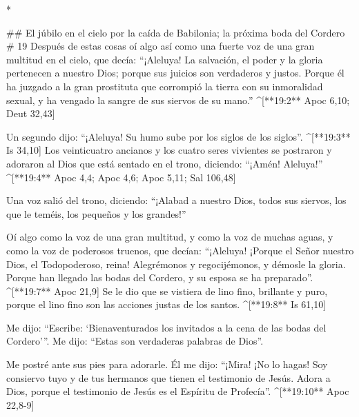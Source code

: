 \begin{paracols}{2}
\begin{english}
\end{english}
\switchcolumn[0]*

## El júbilo en el cielo por la caída de Babilonia; la próxima boda del Cordero
# 19
 Después de estas cosas oí algo así como una fuerte voz de una gran multitud en el cielo, que decía: “¡Aleluya! La salvación, el poder y la gloria pertenecen a nuestro Dios;  porque sus juicios son verdaderos y justos. Porque él ha juzgado a la gran prostituta que corrompió la tierra con su inmoralidad sexual, y ha vengado la sangre de sus siervos de su mano.” ^[**19:2** Apoc 6,10; Deut 32,43]

 Un segundo dijo: “¡Aleluya! Su humo sube por los siglos de los siglos”. ^[**19:3** Is 34,10]  Los veinticuatro ancianos y los cuatro seres vivientes se postraron y adoraron al Dios que está sentado en el trono, diciendo: “¡Amén! Aleluya!” ^[**19:4** Apoc 4,4; Apoc 4,6; Apoc 5,11; Sal 106,48]

 Una voz salió del trono, diciendo: “¡Alabad a nuestro Dios, todos sus siervos, los que le teméis, los pequeños y los grandes!”

 Oí algo como la voz de una gran multitud, y como la voz de muchas aguas, y como la voz de poderosos truenos, que decían: “¡Aleluya! ¡Porque el Señor nuestro Dios, el Todopoderoso, reina!  Alegrémonos y regocijémonos, y démosle la gloria. Porque han llegado las bodas del Cordero, y su esposa se ha preparado”. ^[**19:7** Apoc 21,9]  Se le dio que se vistiera de lino fino, brillante y puro, porque el lino fino son las acciones justas de los santos. ^[**19:8** Is 61,10]

 Me dijo: “Escribe: ‘Bienaventurados los invitados a la cena de las bodas del Cordero’”. Me dijo: “Estas son verdaderas palabras de Dios”.

 Me postré ante sus pies para adorarle. Él me dijo: “¡Mira! ¡No lo hagas! Soy consiervo tuyo y de tus hermanos que tienen el testimonio de Jesús. Adora a Dios, porque el testimonio de Jesús es el Espíritu de Profecía”. ^[**19:10** Apoc 22,8-9]


\end{paracols}
